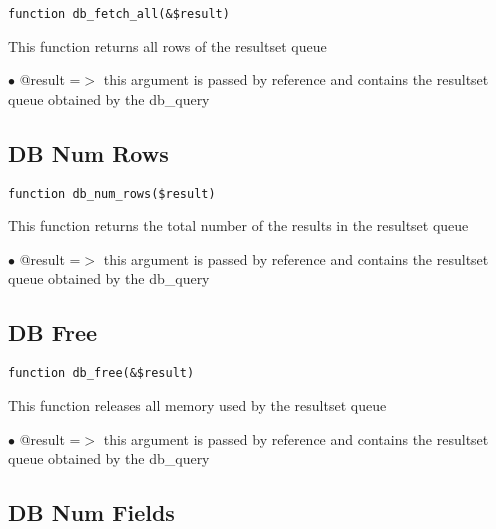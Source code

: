 \documentclass[a4paper]{book}
\begin{document}
\begin{lstlisting}
function db_fetch_all(&$result)
\end{lstlisting}

This function returns all rows of the resultset queue

\begin{compactitem}
\item[\color{myblue}$\bullet$] @result =$>$ this argument is passed by reference and contains the resultset queue
           obtained by the db\_query
\end{compactitem}

\hypertarget{toc69}{}
\subsection{DB Num Rows}

\begin{lstlisting}
function db_num_rows($result)
\end{lstlisting}

This function returns the total number of the results in the resultset queue

\begin{compactitem}
\item[\color{myblue}$\bullet$] @result =$>$ this argument is passed by reference and contains the resultset queue
           obtained by the db\_query
\end{compactitem}

\hypertarget{toc70}{}
\subsection{DB Free}

\begin{lstlisting}
function db_free(&$result)
\end{lstlisting}

This function releases all memory used by the resultset queue

\begin{compactitem}
\item[\color{myblue}$\bullet$] @result =$>$ this argument is passed by reference and contains the resultset queue
           obtained by the db\_query
\end{compactitem}

\hypertarget{toc71}{}
\subsection{DB Num Fields}
\end{document}
